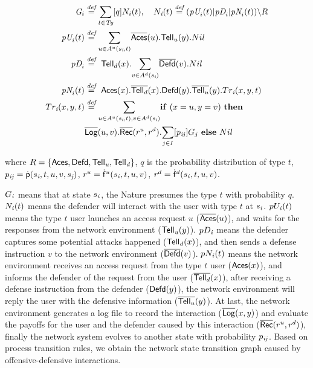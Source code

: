 \documentclass[10pt, conference, compsocconf]{IEEEtran}
\begin{document}
\begin{footnotesize}
\begin{align*}
\textit{G}_{i}&\stackrel{\textit{def}}{=}\underset{t\in \textit{Ty}}{\sum} [q]N_{i}(t),~~~N_{\textit{i}}(t)\stackrel{\textit{def}}{=}(\textit{pU}_i(t)|
\textit{pD}_i|\textit{pN}_i(t)) \backslash R\\
\textit{pU}_{i}(t)&\stackrel{\textit{def}}{=}\underset{u\in A^u(s_{\textit{i}},t)}{\sum}\overline{{\sf Aces}}(u).{\sf Tell}_u(y).Nil        \\
\textit{pD}_{i}&\stackrel{\textit{def}}{=}~{\sf Tell}_d(x).\underset{v\in A^d(s_{\textit{i}})}{\sum}\overline{{\sf Defd}}(v).Nil\\
\textit{pN}_{i}(t)&\stackrel{\textit{def}}{=}   ~{\sf Aces}(x).\overline{{\sf Tell}_d}(x).{\sf Defd}(y).\overline{{\sf Tell}_u}(y). Tr_{\textit{i}}(x,y,t)\\
Tr_{\textit{i}}(x,y,t)&\stackrel{\textit{def}}{=}\underset{u\in A^u(s_{\textit{i}},t), v\in A^d(s_{\textit{i}})}{\sum}{\rm {\bf if}}~(x=u,y=v)~ {\rm {\bf then}}\\
&\overline{{\sf Log}}(u,v).\overline{{\sf Rec}}(r^u, r^d).\underset{j\in I}{\sum}[p_{\it ij}]G_{j} ~{\rm {\bf else}}~Nil
\end{align*}
\end{footnotesize}
where $R=
\{{\sf Aces},{\sf Defd},{\sf Tell}_{\it u},{\sf Tell}_{\it d}\}$, $q$ is the probability distribution of type $t$, $p_{\it ij}={\sf \dot{p}}(s_{\textit{i}},t,u,v,s_{\textit{j}})$,
$r^u={\sf \dot{f}}^u(s_{\it i},t,u,v)$, $r^d={\sf \dot{f}}^d(s_{\it i},t,u,v)$.

$G_{\it i}$ means that at state $s_{\it i}$, the Nature presumes the type $t$ with probability $q$.
$N_{\it i}(t)$ means the defender will interact with the user with type $t$ at $s_{\it i}$.
$pU_{\it i}(t)$ means the type $t$ user launches an access request $u$ ($\overline{{\sf Aces}}(u)$), and waits for the responses from the network environment (${\sf Tell}_{\it u}(y)$).
$pD_{\it i}$ means the defender captures some  potential attacks happened (${\sf Tell}_{\it d}(x)$), and then sends a defense instruction $v$ to the network environment ($\overline{{\sf Defd}}(v)$).
$pN_{\it i}(t)$ means the network environment receives an access request from the type $t$ user (${\sf Aces}(x)$), and informs the defender of the request from the user ($\overline{{\sf Tell}_d}(x)$), after receiving a defense instruction from the defender (${\sf Defd}(y)$), the network environment will reply the user with the defensive information ($\overline{{\sf Tell}_u}(y)$).
At last, the network environment generates a log file to record the interaction ($\overline{{\sf Log}}(x,y)$) and evaluate the payoffs for the user and the defender caused by this interaction ($\overline{{\sf Rec}}(r^u, r^d)$), finally the network system evolves to another state with probability $p_{\it ij}$.
Based on process transition rules, we obtain the network state transition graph caused by offensive-defensive interactions.
\end{document}
